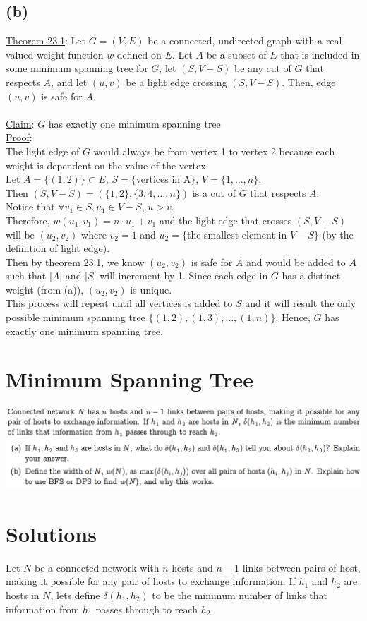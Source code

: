 \documentclass{article}
\begin{document}
\subsection*{(b)} 
\underline{Theorem 23.1}: Let $G = (V, E)$ be a connected, undirected graph with a real-valued weight function $w$ defined on $E$. Let $A$ be a subset of $E$ that is included in some minimum spanning tree for $G$, let $(S, V-S)$ be any cut of $G$ that respects $A$, and let $(u,v)$ be a light edge crossing $(S, V-S)$. Then, edge $(u,v)$ is safe for $A$.\\~\\
\underline{Claim}: $G$ has exactly one minimum spanning tree\\
\underline{Proof}: \\
The light edge of $G$ would always be from vertex 1 to vertex 2 because each weight is dependent on the value of the vertex. \\
Let $A = \{(1,2)\} \subset E$, $S = \{$vertices in A$\}$, $V = \{1,\dots, n\}$. \\
Then $(S, V-S) = (\{1,2\},\{3,4,\dots, n\})$ is a cut of $G$ that respects $A$.\\ 
Notice that $\forall v_1 \in S, u_1 \in V-S$, $u>v$. \\
Therefore, $w(u_1,v_1) = n \cdot u_1 + v_1$ and the light edge that crosses $(S, V-S)$ will be $(u_2,v_2)$ where $v_2 = 1$ and $u_2 = \{$the smallest element in $V-S\}$ (by the definition of light edge).\\
Then by theorem 23.1, we know $(u_2, v_2)$ is safe for $A$ and would be added to $A$ such that $|A|$ and $|S|$ will increment by 1. Since each edge in $G$ has a distinct weight (from (a)), $(u_2, v_2)$ is unique.\\
This process will repeat until all vertices is added to $S$ and it will result the only possible minimum spanning tree $\{(1,2), (1,3), \dots, (1,n)\}$. Hence, $G$ has exactly one minimum spanning tree.
\section*{Minimum Spanning Tree}
\includegraphics[width=\textwidth]{Minimum Spanning Tree}
\section*{Solutions}
Let $N$ be a connected network with $n$ hosts and $n-1$ links between pairs of host, making it possible for any pair of hosts to exchange information. If $h_1$ and $h_2$ are hosts in $N$, lets define $\delta(h_1, h_2)$ to be the minimum number of links that information from $h_1$ passes through to reach $h_2$.
\end{document}
